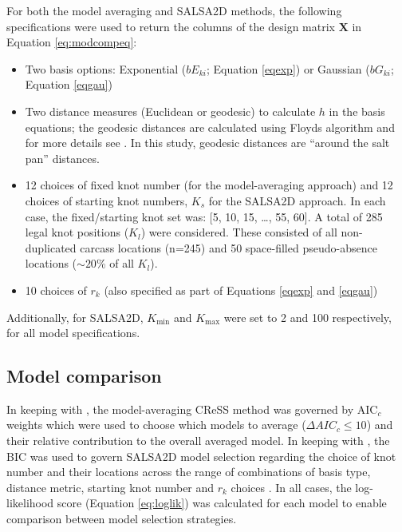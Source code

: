 \documentclass[letterpaper, 12pt]{interact}
\begin{document}
	For both the model averaging and SALSA2D methods, the following specifications were used to return the columns of the design matrix \(\boldsymbol{X}\) in Equation \ref{eq:modcompeq}:
	
	\begin{itemize}
		\item
		Two basis options: Exponential (\(bE_{ki}\); Equation \ref{eqexp}) or
		Gaussian (\(bG_{ki}\); Equation \ref{eqgau})
		\item
		Two distance measures (Euclidean or geodesic) to calculate $h$ in the basis equations; the geodesic distances are calculated using Floyds algorithm \cite{Floyd1962} and for more details see \cite{scott2014}. In this study, geodesic distances are ``around the salt pan'' distances. 
		\item
		12 choices of fixed knot number (for the model-averaging approach) and 12 choices of starting knot numbers, \(K_s\) for the SALSA2D approach. In each case, the fixed/starting knot set was: {[}5, 10, 15, \dots, 55, 60{]}. A total of 285 legal knot positions ($K_l$) were considered. These consisted of all non-duplicated carcass locations (n=245) and 50 space-filled pseudo-absence locations ($\sim20$\% of all $K_l$).
		\item
		10 choices of \(r_k\) (also specified as part of Equations \ref{eqexp}
		and \ref{eqgau})
	\end{itemize}
	
	Additionally, for SALSA2D, \(K_\textrm{min}\) and \(K_\textrm{max}\) were set to 2 and 100 respectively, for all model specifications.
	
	
	\subsection*{Model comparison}\label{model-comparison}
	
	In keeping with \citet{scott2017}, the model-averaging CReSS method was governed by AIC\(_c\) weights which were used to choose which models to average (\(\Delta AIC_c \leq10\)) and their relative contribution to the overall averaged model. In keeping with \citet{Walk2010}, the BIC was used to govern SALSA2D model selection regarding the choice of knot number and their locations across the range of combinations of basis type, distance metric, starting knot number and \(r_k\) choices \cite{schwarz1978}.  In all cases, the log-likelihood score (Equation \ref{eq:loglik}) was calculated for each model to enable comparison between model selection strategies. 
	
\end{document}
